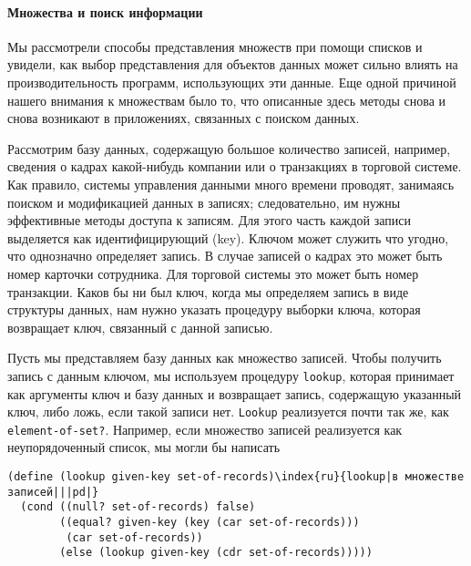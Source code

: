 \paragraph{Множества и поиск информации}


Мы рассмотрели способы представления множеств при помощи списков и увидели, как выбор представления для объектов
данных может сильно влиять на производительность программ, использующих эти 
данные.  Еще одной причиной нашего внимания к множествам
было то, что описанные здесь методы снова и снова возникают в
приложениях, связанных с поиском данных.

Рассмотрим базу данных, содержащую большое количество 
записей, например, сведения о кадрах какой-нибудь компании или
о транзакциях в торговой системе.  Как правило, системы управления
данными много времени проводят, занимаясь поиском и модификацией данных в
записях; следовательно, им нужны эффективные методы доступа к
записям.  Для этого часть каждой записи выделяется как
идентифицирующий  (key).  
Ключом может служить 
что угодно, что однозначно определяет запись.  В случае записей о
кадрах это может быть номер карточки сотрудника.  Для торговой системы 
это может быть номер транзакции.  Каков бы ни был ключ,  когда мы
определяем запись в виде структуры данных, нам нужно указать процедуру 
выборки ключа,
которая возвращает ключ, связанный с данной
записью.

Пусть мы представляем базу данных как множество записей.
Чтобы получить запись с данным ключом, мы используем процедуру
{\tt lookup}, которая принимает как аргументы ключ и базу
данных и возвращает запись, содержащую указанный ключ, либо ложь, если
такой записи нет.  {\tt Lookup} реализуется почти так же, как
{\tt element-of-set?}.  Например, если множество записей
реализуется как неупорядоченный список, мы могли бы написать

\begin{Verbatim}[fontsize=\small]
(define (lookup given-key set-of-records)\index{ru}{lookup|в множестве записей|||pd|}
  (cond ((null? set-of-records) false)
        ((equal? given-key (key (car set-of-records)))
         (car set-of-records))
        (else (lookup given-key (cdr set-of-records)))))
\end{Verbatim}

